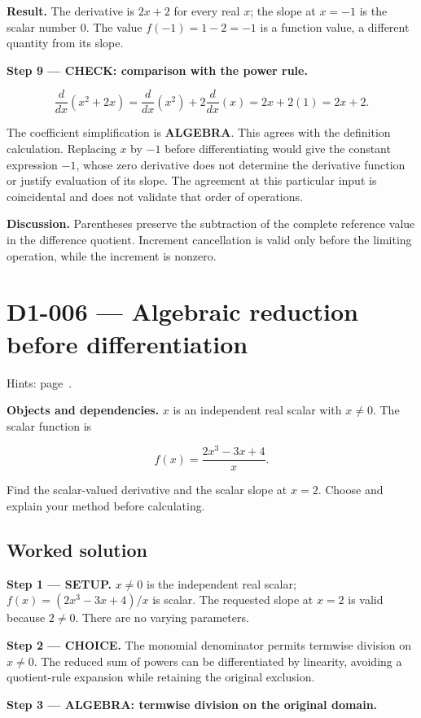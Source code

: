 \documentclass[11pt,oneside,openany]{book}
\begin{document}
\endgroup
\textbf{Result.} The derivative is \(2x+2\) for every real \(x\); the slope at \(x=-1\)
is the scalar number \(0\). The value \(f(-1)=1-2=-1\) is a function value, a
different quantity from its slope.

\textbf{Step 9 --- CHECK: comparison with the power rule.}

\[
\frac{d}{dx}\left(x^2+2x\right)
=\frac{d}{dx}\left(x^2\right)+2\frac{d}{dx}\left(x\right)
=2x+2(1)=2x+2.
\]

The coefficient simplification is \textbf{ALGEBRA}. This agrees with the definition
calculation. Replacing \(x\) by \(-1\) before differentiating would give the constant
expression \(-1\), whose zero derivative does not determine the derivative function
or justify evaluation of its slope. The agreement at this particular input is coincidental and does not validate
that order of operations.

\textbf{Discussion.} Parentheses preserve the subtraction of the complete
reference value in the difference quotient. Increment cancellation is valid
only before the limiting operation, while the increment is nonzero.
\clearpage
\section{D1-006 --- Algebraic reduction before differentiation}
\label{problem:D1-006}
{\small Hints: page~\pageref{hints:D1-006}.}\par\medskip

\textbf{Objects and dependencies.} \(x\) is an independent real scalar with \(x\ne0\).
The scalar function is

\[
f(x)=\frac{2x^3-3x+4}{x}.
\]

Find the scalar-valued derivative and the scalar slope at \(x=2\).
Choose and explain your method before calculating.
\subsection*{Worked solution}

\textbf{Step 1 --- SETUP.} \(x\ne0\) is the independent real scalar;
\(f(x)=(2x^3-3x+4)/x\) is scalar. The requested slope at \(x=2\) is valid because
\(2\ne0\). There are no varying parameters.

\begin{ChoiceStep}
\textbf{Step 2 --- CHOICE.} The monomial denominator permits termwise division on \(x\ne0\).
The reduced sum of powers can be differentiated by linearity, avoiding a
quotient-rule expansion while retaining the original exclusion.

\end{ChoiceStep}
\begingroup\color{AlgebraBlue}
\textbf{Step 3 --- ALGEBRA: termwise division on the original domain.}
\end{document}
